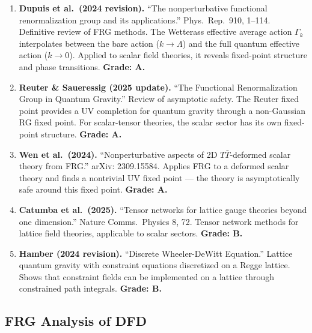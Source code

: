 \documentclass[11pt,a4paper]{article}
\begin{document}
\begin{enumerate}
\item \textbf{Dupuis et al.\ (2024 revision).} ``The nonperturbative functional renormalization group and its applications.'' Phys.\ Rep.\ 910, 1--114. Definitive review of FRG methods. The Wetterass effective average action $\Gamma_k$ interpolates between the bare action ($k \to \Lambda$) and the full quantum effective action ($k \to 0$). Applied to scalar field theories, it reveals fixed-point structure and phase transitions. \textbf{Grade: A.}

\item \textbf{Reuter \& Saueressig (2025 update).} ``The Functional Renormalization Group in Quantum Gravity.'' Review of asymptotic safety. The Reuter fixed point provides a UV completion for quantum gravity through a non-Gaussian RG fixed point. For scalar-tensor theories, the scalar sector has its own fixed-point structure. \textbf{Grade: A.}

\item \textbf{Wen et al.\ (2024).} ``Nonperturbative aspects of 2D $T\bar{T}$-deformed scalar theory from FRG.'' arXiv: 2309.15584. Applies FRG to a deformed scalar theory and finds a nontrivial UV fixed point --- the theory is asymptotically safe around this fixed point. \textbf{Grade: A.}

\item \textbf{Catumba et al.\ (2025).} ``Tensor networks for lattice gauge theories beyond one dimension.'' Nature Comms.\ Physics 8, 72. Tensor network methods for lattice field theories, applicable to scalar sectors. \textbf{Grade: B.}

\item \textbf{Hamber (2024 revision).} ``Discrete Wheeler-DeWitt Equation.'' Lattice quantum gravity with constraint equations discretized on a Regge lattice. Shows that constraint fields can be implemented on a lattice through constrained path integrals. \textbf{Grade: B.}
\end{enumerate}

\subsection{FRG Analysis of DFD}
\end{document}
